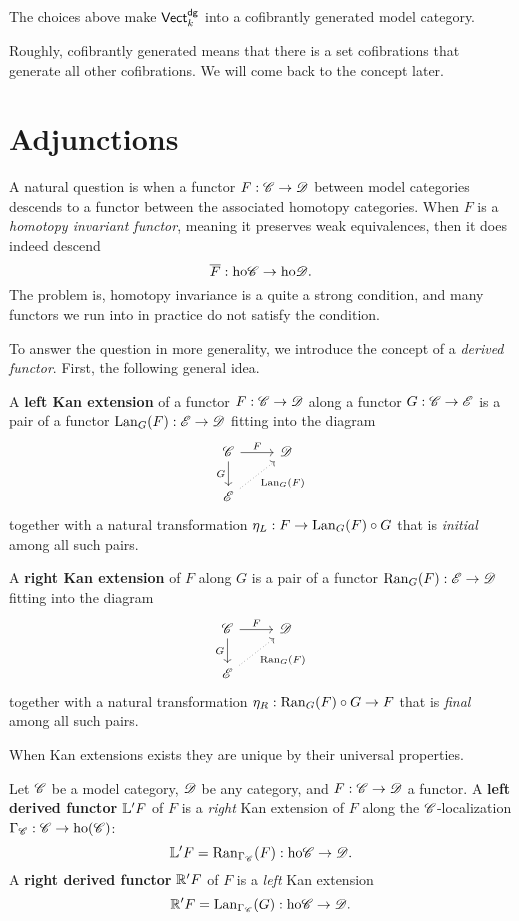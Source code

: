 \documentclass[11pt]{amsart}
\def\ho{{\rm ho}}
\def\Ran{{\rm Ran}}
\def\Lan{{\rm Lan}}
\begin{document}
\begin{thm}[Hovey]
The choices above make ${\sf Vect}^{\sf dg}_k$ into a cofibrantly generated model category.
\end{thm}

Roughly, cofibrantly generated means that there is a set cofibrations that generate all other cofibrations. 
We will come back to the concept later. 

\section{Adjunctions}

A natural question is when a functor $F : \mathscr C \to \mathscr D$ between model categories descends to a functor between the associated homotopy categories. 
When $F$ is a {\em homotopy invariant functor}, meaning it preserves weak equivalences, then it does indeed descend 
\[
\Bar{F} : \ho \sC \to \ho \sD .
\]
The problem is, homotopy invariance is a quite a strong condition, and many functors we run into in practice do not satisfy the condition. 

To answer the question in more generality, we introduce the concept of a {\em derived functor}.
First, the following general idea.
\begin{dfn}
A {\bf left Kan extension} of a functor $F : \mathscr C \to \mathscr D$ along a functor $G : \mathscr C \to \mathscr E$ is a pair of a functor $\Lan_G(F) : \sE \to \sD$ fitting into the diagram
\[
\begin{tikzcd}
\sC \ar[d, "G"'] \ar[r,"F"] & \sD \\
\sE \ar[ur, dotted, "\Lan_G(F)"'] &
\end{tikzcd}
\]
together with a natural transformation $\eta_L : F \to \Lan_G(F) \circ G$ that is {\em initial} among all such pairs. 

A {\bf right Kan extension} of $F$ along $G$ is a pair of a functor $\Ran_G(F) : \sE \to \sD$ fitting into the diagram
\[
\begin{tikzcd}
\sC \ar[d, "G"'] \ar[r,"F"] & \sD \\
\sE \ar[ur, dotted, "\Ran_G(F)"'] &
\end{tikzcd}
\]
together with a natural transformation $\eta_R : \Ran_G(F) \circ G \to F$ that is {\em final} among all such pairs. 
\end{dfn}

When Kan extensions exists they are unique by their universal properties. 

\begin{dfn}
Let $\mathscr C$ be a model category, $\mathscr D$ be any category, and $F : \mathscr C \to \mathscr D$ a functor. 
A {\bf left derived functor} $\mathbb L ' F$ of $F$ is a {\em right} Kan extension of $F$ along the $\mathscr C$-localization $\Gamma_\sC : \sC \to \ho (\sC)$:
\[
\LL ' F = \Ran_{\Gamma_\sC} (F) : \ho \sC \to \sD .
\] 
A {\bf right derived functor} $\mathbb R ' F$ of $F$ is a {\em left} Kan extension
\[
\RR ' F = \Lan_{\Gamma_{\sC}} (G) : \ho \sC \to \sD .
\] 
\end{dfn}
\end{document}

